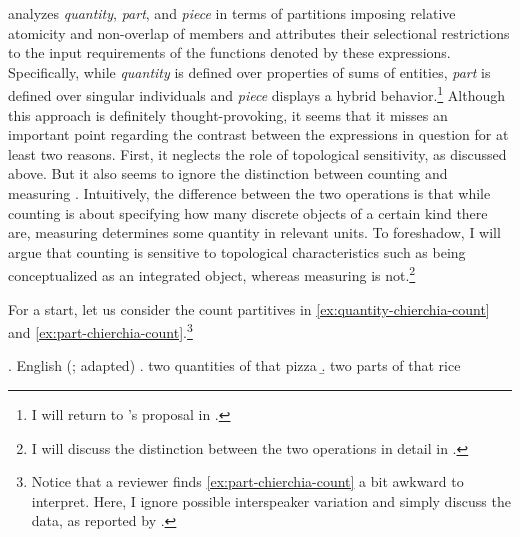 \citeauthor{chierchia2010mass} analyzes \textit{quantity}, \textit{part}, and \textit{piece} in terms of partitions imposing relative atomicity and non-overlap of members and attributes their selectional restrictions to the input requirements of the functions denoted by these expressions. Specifically, while \textit{quantity} is defined over properties of sums of entities, \textit{part} is defined over singular individuals and \textit{piece} displays a hybrid behavior.\footnote{I will return to \citeauthor{chierchia2010mass}'s proposal in .} Although this approach is definitely thought-provoking, it seems that it misses an important point regarding the contrast between the expressions in question for at least two reasons. First, it neglects the role of topological sensitivity, as discussed above. But it also seems to ignore the distinction between counting and measuring \citep[see, e.g.,][]{rothstein2009individuating,rothstein2010counting,rothstein2011counting,rothstein2017semantics,partee_borschev2012sortal,khrizman_et-al2015portion,landman2016iceberg}. Intuitively, the difference between the two operations is that while counting is about specifying how many discrete objects of a certain kind there are, measuring determines some quantity in relevant units. To foreshadow, I will argue that counting is sensitive to topological characteristics such as being conceptualized as an integrated object, whereas measuring is not.\footnote{I will discuss the distinction between the two operations in detail in .} 

For a start, let us consider the count partitives in \ref{ex:quantity-chierchia-count} and \ref{ex:part-chierchia-count}.\footnote{Notice that a reviewer finds \ref{ex:part-chierchia-count} a bit awkward to interpret. Here, I ignore possible interspeaker variation and simply discuss the data, as reported by \citeauthor{chierchia2010mass}.} 

    \ex. English (\citealt{chierchia2010mass}; adapted)\label{ex:quantity-part-chierchia}
	\a. two quantities of that pizza\label{ex:quantity-chierchia-count}
	\b. two parts of that rice\label{ex:part-chierchia-count}

